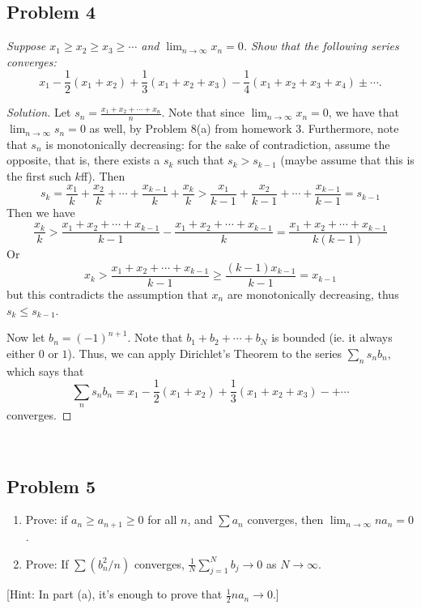 \documentclass{article}
\begin{document}
{\subsection*{Problem 4}
{\it Suppose $x_1 \geq x_2 \geq x_3 \geq \cdots$ and $\lim_{n \to \infty}x_n = 0$.
Show that the following series converges:
\[
	x_1 - \frac{1}{2}(x_1 + x_2) + \frac{1}{3}(x_1 + x_2 + x_3)
	- \frac{1}{4}(x_1 + x_2 + x_3 + x_4) \pm \cdots.
\]}
\begin{proof}[Solution]\let\qed\relax
	Let $s_n = \frac{x_1 + x_2 + \cdots + x_n}{n}$.
	Note that since $\lim_{n\to\infty} x_n = 0$,
	we have that $\lim_{n\to\infty} s_n = 0$ as well,
	by Problem 8(a) from homework 3.
	Furthermore, note that $s_n$ is monotonically decreasing:
	for the sake of contradiction, assume the opposite,
	that is, there exists a $s_k$ such that $s_k > s_{k-1}$
	(maybe assume that this is the first such $k$ff).
	Then
	\[
		s_k = \frac{x_1}{k} + \frac{x_2}{k} + \cdots + \frac{x_{k-1}}{k} + \frac{x_k}{k}
		> \frac{x_1}{k-1} + \frac{x_2}{k-1} + \cdots + \frac{x_{k-1}}{k-1} = s_{k-1}
	\]
	Then we have
	\[
		\frac{x_k}{k} > \frac{x_1 + x_2 + \cdots + x_{k-1}}{k-1} - \frac{x_1 + x_2 + \cdots + x_{k-1}}{k} = \frac{x_1 + x_2 + \cdots + x_{k-1}}{k(k-1)}
	\]
	Or
	\[
		x_k > \frac{x_1 + x_2 + \cdots + x_{k-1}}{k-1} \geq \frac{(k-1)x_{k-1}}{k-1} = x_{k-1}
	\]
	but this contradicts the assumption that $x_n$ are monotonically decreasing,
	thus $s_k \leq s_{k-1}$.

	Now let $b_n = (-1)^{n+1}$.
	Note that $b_1 + b_2 + \cdots + b_N$ is bounded
	(ie. it always either $0$ or $1$).
	Thus, we can apply Dirichlet's Theorem to the series $\sum_n s_nb_n$,
	which says that
	\[
		\sum_n s_nb_n = x_1 - \frac12(x_1 + x_2) + \frac13(x_1 + x_2 + x_3) -+ \cdots
	\]
	converges.
\end{proof}
\clearpage
~\clearpage

\subsection*{Problem 5}
{\it \begin{enumerate}
	\item Prove: if $a_n \geq a_{n+1} \geq 0$ for all $n$,
	and $\sum a_n$ converges, then $\lim_{n\to\infty}na_n = 0$.
	\item Prove: If $\sum(b_n^2/n)$ converges,
	$\frac{1}{N}\sum_{j=1}^N b_j \to 0$ as $N \to \infty$.
\end{enumerate}
[Hint: In part (a), it's enough to prove that $\frac12 na_n \to 0$.]

}}
\end{document}
